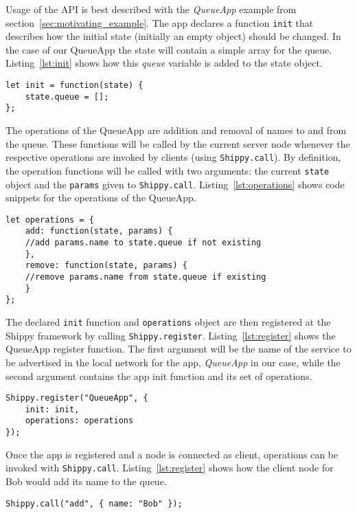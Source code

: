 Usage of the API is best described with the \textit{QueueApp} example from section~\ref{sec:motivating_example}.
The app declares a function \texttt{init} that describes how the initial state (initially an empty object) should be changed.
In the case of our QueueApp the state will contain a simple array for the queue.
Listing~\ref{lst:init} shows how this \textit{queue} variable is added to the state object.

\begin{lstlisting}[caption={QueueApp init function},label={lst:init}]
let init = function(state) {
    state.queue = [];
};
\end{lstlisting}

The operations of the QueueApp are addition and removal of names to and from the queue.
These functions will be called by the current server node whenever the respective operations are invoked by clients (using \texttt{Shippy.call}).
By definition, the operation functions will be called with two arguments: the current \texttt{state} object and the \texttt{params} given to \texttt{Shippy.call}.
Listing~\ref{lst:operations} shows code snippets for the operations of the QueueApp.

\begin{lstlisting}[caption={QueueApp operations},label={lst:operations}]
let operations = {
    add: function(state, params) {
    //add params.name to state.queue if not existing
    },
    remove: function(state, params) {
    //remove params.name from state.queue if existing
    }
};
\end{lstlisting}

The declared \texttt{init} function and \texttt{operations} object are then registered at the Shippy framework by calling \texttt{Shippy.register}.
Listing~\ref{lst:register} shows the QueueApp register function.
The first argument will be the name of the service to be advertised in the local network for the app, \textit{QueueApp} in our case,
 while the second argument contains the app init function and its set of operations.


\begin{lstlisting}[caption={Shippy.register},label={lst:register}]
Shippy.register("QueueApp", {
    init: init,
    operations: operations
});
\end{lstlisting}

Once the app is registered and a node is connected as client, operations can be invoked with \texttt{Shippy.call}. Listing~\ref{lst:register} shows how the client node for Bob would add its name to the queue.
\begin{lstlisting}[caption={Shippy.call},label={lst:call}]
Shippy.call("add", { name: "Bob" });
\end{lstlisting}

